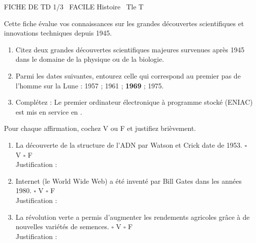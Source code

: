 \documentclass[11pt]{article}
\begin{document}
\begin{tcolorbox}[enhanced,colback=popink,colframe=popink,arc=10pt,boxrule=0pt,left=12pt,right=12pt,top=9pt,bottom=9pt]
{\color{white}\popxbold\small FICHE DE TD 1/3 \textbullet\ FACILE \hfill Histoire \textbullet\ Tle T\par}
\end{tcolorbox}
\vspace{4pt}
Cette fiche évalue vos connaissances sur les grandes découvertes scientifiques et innovations techniques depuis 1945.

\begin{exercice}
\begin{enumerate}
    \item Citez deux grandes découvertes scientifiques majeures survenues après 1945 dans le domaine de la physique ou de la biologie.
    \item Parmi les dates suivantes, entourez celle qui correspond au premier pas de l'homme sur la Lune : 1957 ; 1961 ; \textbf{1969} ; 1975.
    \item Complétez : Le premier ordinateur électronique à programme stocké (ENIAC) est mis en service en \dotfill.
\end{enumerate}
\end{exercice}

\begin{exercice}
Pour chaque affirmation, cochez V ou F et justifiez brièvement.
\begin{enumerate}
    \item La découverte de la structure de l'ADN par Watson et Crick date de 1953. \hfill $\square$ V \quad $\square$ F \\
    Justification : \dotfill
    \item Internet (le World Wide Web) a été inventé par Bill Gates dans les années 1980. \hfill $\square$ V \quad $\square$ F \\
    Justification : \dotfill
    \item La révolution verte a permis d'augmenter les rendements agricoles grâce à de nouvelles variétés de semences. \hfill $\square$ V \quad $\square$ F \\
    Justification : \dotfill
\end{enumerate}
\end{exercice}
\end{document}
